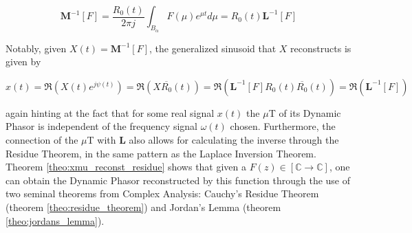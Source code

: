 	\begin{equation} \mathbf{M}^{-1}\left[F\right] = \dfrac{R_0(t)}{2\pi j}\int_{B_\alpha} F\left(\mu\right) e^{\mu  t} d\mu = R_0(t)\mathbf{L}^{-1}\left[F\right] \label{eq:inv_muT_def}\end{equation}

	Notably, given $X(t) = \mathbf{M}^{-1}\left[F\right]$, the generalized sinusoid that $X$ reconstructs is given by

\begin{equation} x(t) = \Re\left(X(t)e^{j\psi(t)}\right) = \Re\left(X \overline{R_0}(t)\right) = \Re\left(\mathbf{L}^{-1}\left[F\right]R_0(t)\overline{R_0}(t)\right) = \Re\left(\mathbf{L}^{-1}\left[F\right]\right)\end{equation}

	\noindent again hinting at the fact that for some real signal $x(t)$ the $\mu$T of its Dynamic Phasor is independent of the frequency signal $\omega(t)$ chosen. Furthermore, the connection of the $\mu$T with $\mathbf{L}$ also allows for calculating the inverse through the Residue Theorem, in the same pattern as the Laplace Inversion Theorem. Theorem \ref{theo:xmu_reconst_residue} shows that given a $F(z)\in\left[\mathbb{C}\to\mathbb{C}\right]$, one can obtain the Dynamic Phasor reconstructed by this function through the use of two seminal theorems from Complex Analysis: Cauchy's Residue Theorem (theorem \ref{theo:residue_theorem}) and Jordan's Lemma (theorem \ref{theo:jordans_lemma}).

